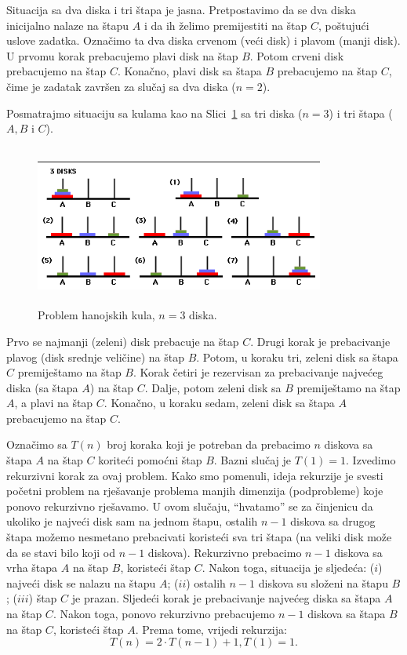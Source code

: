 \begin{solution}
 
 
 	Situacija sa dva diska i tri štapa je jasna. Pretpostavimo da se dva diska inicijalno nalaze na štapu $A$ i da ih želimo premijestiti na štap $C$, poštujući uslove zadatka. Označimo ta dva diska crvenom (veći disk) i plavom (manji disk). U prvomu korak prebacujemo plavi disk na štap $B$. Potom crveni disk prebacujemo na štap $C$. Konačno, plavi disk sa štapa $B$ prebacujemo na štap $C$, čime je zadatak završen za slučaj sa dva diska ($n=2$).
 	
 	Posmatrajmo situaciju sa kulama kao na Slici~\ref{fig:tower} sa tri diska ($n=3$) i tri štapa ($A, B$ i $C$). 
 	
 	\begin{figure}[H]
 		\centering
 		\includegraphics[width=270pt,height=150pt]{slike/tower.png}


 	 \caption{Problem hanojskih kula, $n=3$ diska.\protect\footnotemark}     \label{fig:tower}
 	 	\end{figure}


 Prvo se najmanji (zeleni) disk prebacuje na štap $C$. Drugi korak je prebacivanje plavog (disk srednje veličine) na štap $B$. Potom, u koraku tri, zeleni disk sa štapa $C$ premiještamo na štap $B$. Korak četiri je rezervisan za prebacivanje najvećeg diska (sa štapa $A$)  na štap $C$. Dalje, potom zeleni disk sa $B$ premiještamo na štap $A$, a plavi na štap $C$. Konačno, u koraku sedam, zeleni disk sa štapa $A$ prebacujemo na štap $C$.  
 
Označimo sa $T(n)$ broj koraka koji je potreban da prebacimo $n$ diskova sa štapa $A$ na štap $C$ koriteći pomoćni štap $B$. Bazni slučaj je $T(1) = 1$. Izvedimo rekurzivni korak za ovaj problem. Kako smo pomenuli, ideja rekurzije je svesti početni problem na rješavanje problema manjih dimenzija (podprobleme) koje ponovo   rekurzivno rješavamo. U ovom slučaju, ``hvatamo'' se za činjenicu da ukoliko je najveći disk sam na jednom štapu, ostalih $n-1$ diskova sa drugog štapa možemo nesmetano prebacivati koristeći sva tri štapa (na veliki disk može da se stavi bilo koji od $n-1$ diskova). Rekurzivno prebacimo $n-1$ diskova sa vrha štapa $A$ na štap $B$, koristeći štap $C$. Nakon toga, situacija je  sljedeća: ($i$) najveći disk se nalazu na štapu $A$; ($ii$) ostalih $n-1$ diskova su složeni na štapu $B$; ($iii$) štap $C$ je prazan. Sljedeći korak je prebacivanje najvećeg diska sa štapa $A$ na štap $C$. Nakon toga, ponovo rekurzivno prebacujemo $n-1$ diskova sa štapa $B$ na štap $C$, koristeći štap $A$. Prema tome, vrijedi rekurzija:
$$ T(n) = 2 \cdot T(n-1) + 1, T(1) = 1.$$
 

\end{solution}
